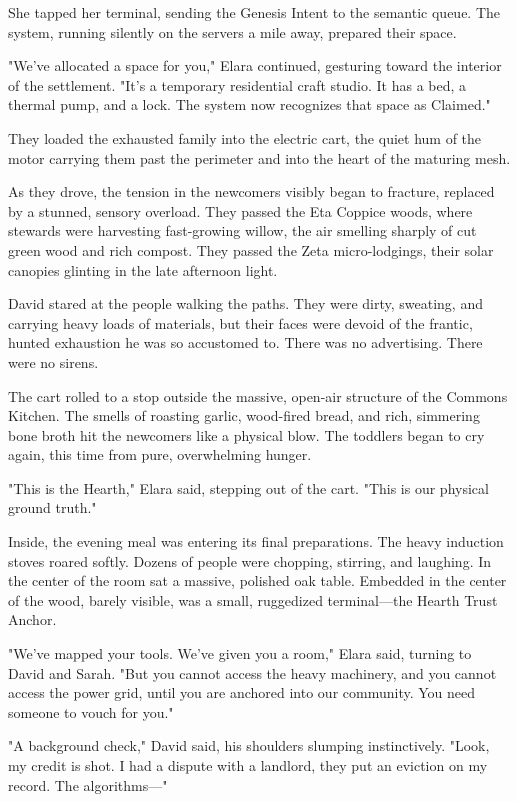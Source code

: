 She tapped her terminal, sending the Genesis Intent to the semantic queue. The system, running silently on the servers a mile away, prepared their space. 

"We've allocated a space for you," Elara continued, gesturing toward the interior of the settlement. "It's a temporary residential craft studio. It has a bed, a thermal pump, and a lock. The system now recognizes that space as Claimed."

They loaded the exhausted family into the electric cart, the quiet hum of the motor carrying them past the perimeter and into the heart of the maturing mesh. 

As they drove, the tension in the newcomers visibly began to fracture, replaced by a stunned, sensory overload. They passed the Eta Coppice woods, where stewards were harvesting fast-growing willow, the air smelling sharply of cut green wood and rich compost. They passed the Zeta micro-lodgings, their solar canopies glinting in the late afternoon light. 

David stared at the people walking the paths. They were dirty, sweating, and carrying heavy loads of materials, but their faces were devoid of the frantic, hunted exhaustion he was so accustomed to. There was no advertising. There were no sirens. 

The cart rolled to a stop outside the massive, open-air structure of the Commons Kitchen. The smells of roasting garlic, wood-fired bread, and rich, simmering bone broth hit the newcomers like a physical blow. The toddlers began to cry again, this time from pure, overwhelming hunger.

"This is the Hearth," Elara said, stepping out of the cart. "This is our physical ground truth."

Inside, the evening meal was entering its final preparations. The heavy induction stoves roared softly. Dozens of people were chopping, stirring, and laughing. In the center of the room sat a massive, polished oak table. Embedded in the center of the wood, barely visible, was a small, ruggedized terminal—the Hearth Trust Anchor.

"We’ve mapped your tools. We've given you a room," Elara said, turning to David and Sarah. "But you cannot access the heavy machinery, and you cannot access the power grid, until you are anchored into our community. You need someone to vouch for you."

"A background check," David said, his shoulders slumping instinctively. "Look, my credit is shot. I had a dispute with a landlord, they put an eviction on my record. The algorithms—"

